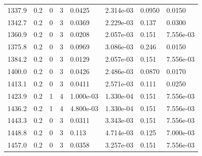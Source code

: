 \documentclass[preview]{standalone}
\begin{document}
{{{{{\begin{tabular}{L{1.2cm}C{1.2cm} C{0.3cm}C{0.5cm} C{1.4cm}C{1.4cm} C{1.4cm}C{1.4cm}}
  1337.9  &   0.2  & 0     &  3 &  0.0425  & 2.314e-03  & 0.0950 &  0.0150   \\ 
  1342.7  &   0.2  & 0     &  3 &  0.0369  & 2.229e-03  & 0.137 &  0.0300   \\ 
  1360.9  &   0.2  & 0     &  3 &  0.0208  & 2.057e-03  & 0.151 &  7.556e-03   \\ 
  1375.8  &   0.2  & 0     &  3 &  0.0969  & 3.086e-03  & 0.246 &  0.0150   \\ 
  1384.2  &   0.2  & 0     &  3 &  0.0129  & 2.057e-03  & 0.151 &  7.556e-03   \\ 
  1400.0  &   0.2  & 0     &  3 &  0.0426  & 2.486e-03  & 0.0870 &  0.0170   \\ 
  1413.1  &   0.2  & 0     &  3 &  0.0411  & 2.571e-03  & 0.111 &  0.0250   \\ 
  1423.9  &   0.2  & 1     &  4 &  1.000e-03  & 1.330e-04  & 0.151 &  7.556e-03   \\ 
  1436.2  &   0.2  & 1     &  4 &  4.800e-03  & 1.330e-04  & 0.151 &  7.556e-03   \\ 
  1443.3  &   0.2  & 0     &  3 &  0.0311  & 3.343e-03  & 0.151 &  7.556e-03   \\ 
  1448.8  &   0.2  & 0     &  3 &  0.113  & 4.714e-03  & 0.125 &  7.000e-03   \\ 
  1457.0  &   0.2  & 0     &  3 &  0.0358  & 3.257e-03  & 0.151 &  7.556e-03   \\ 
\hline 
\end{tabular} 

}}}}}
\end{document}
